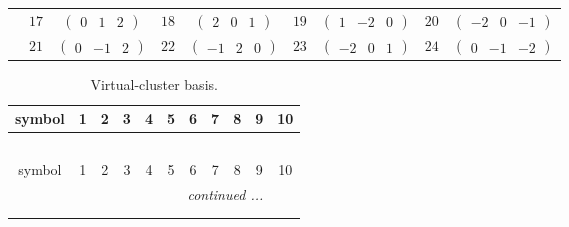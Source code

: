 \documentclass[fleqn,10pt,landscape]{article}
\begin{document}
\begin{itemize}
{\begin{center}
\begin{longtable}{ccccccccc}
& $ 17 $ & $ \begin{pmatrix} 0 & 1 & 2 \end{pmatrix} $ & $ 18 $ & $ \begin{pmatrix} 2 & 0 & 1 \end{pmatrix} $ & $ 19 $ & $ \begin{pmatrix} 1 & -2 & 0 \end{pmatrix} $ & $ 20 $ & $ \begin{pmatrix} -2 & 0 & -1 \end{pmatrix} $ \\
& $ 21 $ & $ \begin{pmatrix} 0 & -1 & 2 \end{pmatrix} $ & $ 22 $ & $ \begin{pmatrix} -1 & 2 & 0 \end{pmatrix} $ & $ 23 $ & $ \begin{pmatrix} -2 & 0 & 1 \end{pmatrix} $ & $ 24 $ & $ \begin{pmatrix} 0 & -1 & -2 \end{pmatrix} $ \\
\end{longtable}
\end{center}
\begin{center}
\renewcommand{\arraystretch}{1.7}
\begin{longtable}{ccccccccccc}
\caption{Virtual-cluster basis.}
 \\
 \hline \hline
symbol & 1 & 2 & 3 & 4 & 5 & 6 & 7 & 8 & 9 & 10 \\ \hline \endfirsthead

\multicolumn{10}{l}{\tablename\ \thetable{}} \\
 \hline \hline
symbol & 1 & 2 & 3 & 4 & 5 & 6 & 7 & 8 & 9 & 10 \\ \hline \endhead

 \hline \hline
\multicolumn{10}{r}{\footnotesize\it continued ...} \\ \endfoot

 \hline \hline
\multicolumn{10}{r}{} \\ \endlastfoot


\end{longtable}
\end{center}}
\end{itemize}
\end{document}
